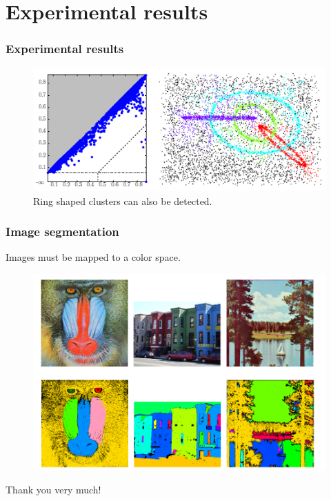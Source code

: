 \documentclass{beamer}
\theoremstyle{definition}
\begin{document}
\section{Experimental results}
\begin{frame}
\frametitle{Experimental results}
\begin{figure}
\centering
\includegraphics[scale=1]{rings}
\caption{Ring shaped clusters can also be detected.}
\end{figure}
\end{frame}

\begin{frame}
\frametitle{Image segmentation}
Images must be mapped to a color space. %
\begin{figure}
\centering
\includegraphics[scale=0.5]{segmentation}
\end{figure}
\end{frame}

\begin{frame}
\begin{center}
\Huge{Thank you very much!}
\end{center}
\end{frame}
\end{document}

